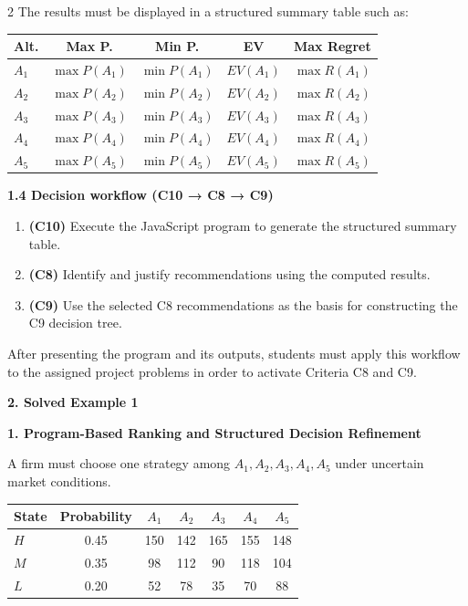 \documentclass[12pt]{article}
\newcommand{\SubsectionBox}[1]{%
	\noindent\colorbox{gray!30}{%
		\parbox{\linewidth}{\textbf{#1}}%
	}\par\vspace{0.35cm}%
}
\begin{document}
\begin{multicols}{2}
		The results must be displayed in a structured summary table such as:
		\begin{center}
			\begin{tabular}{l c c c c}
				\hline
				Alt. & Max P. & Min P. & EV & Max Regret \\
				\hline
				$A_1$ & $\max P(A_1)$ & $\min P(A_1)$ & $EV(A_1)$ & $\max R(A_1)$ \\
				$A_2$ & $\max P(A_2)$ & $\min P(A_2)$ & $EV(A_2)$ & $\max R(A_2)$ \\
				$A_3$ & $\max P(A_3)$ & $\min P(A_3)$ & $EV(A_3)$ & $\max R(A_3)$ \\
				$A_4$ & $\max P(A_4)$ & $\min P(A_4)$ & $EV(A_4)$ & $\max R(A_4)$ \\
				$A_5$ & $\max P(A_5)$ & $\min P(A_5)$ & $EV(A_5)$ & $\max R(A_5)$ \\
				\hline
			\end{tabular}
		\end{center}
		
		\vspace{0.25cm}
		\textbf{1.4 Decision workflow (C10 → C8 → C9)}\par
		
		\begin{enumerate}
			\item \textbf{(C10)} Execute the JavaScript program to generate the structured summary table.
			\item \textbf{(C8)} Identify and justify recommendations using the computed results.
			\item \textbf{(C9)} Use the selected C8 recommendations as the basis for constructing the C9 decision tree.
		\end{enumerate}
		
		After presenting the program and its outputs, students must apply this workflow to the assigned project problems in order to activate Criteria C8 and C9.
		
		\newpage
		\SubsectionBox{2. Solved Example 1}
		
		\textbf{1. Program-Based Ranking and Structured Decision Refinement}\par
		A firm must choose one strategy among $A_1,A_2,A_3,A_4,A_5$ under uncertain market conditions.
		
		\begin{center}
			\begin{tabular}{l  c c c c c c}
				\hline
				State & Probability & $A_1$ & $A_2$ & $A_3$ & $A_4$ & $A_5$ \\
				\hline
				$H$ & 0.45 & 150 & 142 & 165 & 155 & 148 \\
				$M$ & 0.35 & 98 & 112 & 90 & 118 & 104 \\
				$L$ & 0.20 & 52 & 78 & 35 & 70 & 88 \\
				\hline
			\end{tabular}
		\end{center}
		

\end{multicols}
\end{document}
